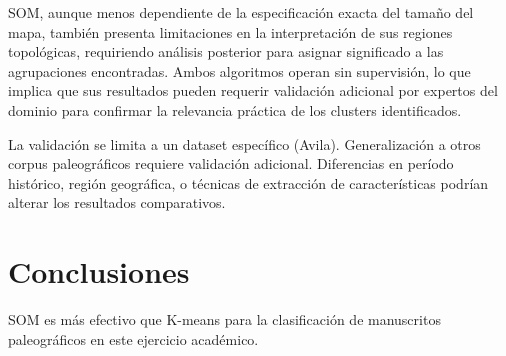 \documentclass[12pt,a4paper]{article}
\begin{document}
SOM, aunque menos dependiente de la especificación exacta del tamaño del mapa, también presenta limitaciones en la interpretación de sus regiones topológicas, requiriendo análisis posterior para asignar significado a las agrupaciones encontradas. Ambos algoritmos operan sin supervisión, lo que implica que sus resultados pueden requerir validación adicional por expertos del dominio para confirmar la relevancia práctica de los clusters identificados.

La validación se limita a un dataset específico (Avila). Generalización a otros corpus paleográficos requiere validación adicional. Diferencias en período histórico, región geográfica, o técnicas de extracción de características podrían alterar los resultados comparativos.

\section{Conclusiones}

SOM es más efectivo que K-means para la clasificación de manuscritos paleográficos en este ejercicio académico.



\end{document}
